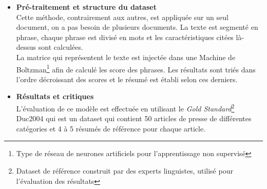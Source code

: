             \begin{itemize}[leftmargin=*]
                \item{\textbf{Pré-traitement et structure du dataset}}\\
                Cette méthode, contrairement aux autres, est appliquée sur un seul document, on a pas besoin de plusieurs documents. La texte est segmenté en phrase, chaque phrase est divisé en mots et les caractéristiques citées là-dessus sont calculées.\\

                La matrice qui représentent le texte est injectée dans une Machine de Boltzman\footnote{Type de réseau de neurones artificiels pour l'apprentissage non supervisé} afin de calculé les score des phrases. Les résultats sont triés dans l'ordre décroissant des scores et le résumé est établi selon ces derniers.\\

                \item{\textbf{Résultats et critiques}}\\
                L'évaluation de ce modèle est effectuée en utilisant le \emph{Gold Standard}\footnote{Dataset de référence construit par des experts linguistes, utilisé pour l'évaluation des résultats} Duc2004 qui est un dataset qui contient 50 articles de presse de différentes catégories et 4 à 5 résumés de référence pour chaque article.


\end{itemize}
